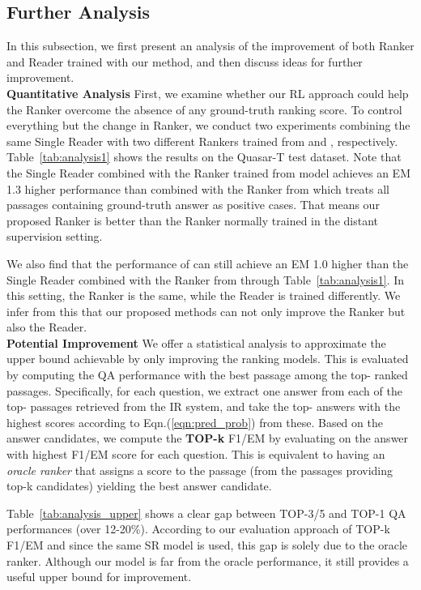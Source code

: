 \documentclass[letterpaper]{article} \usepackage{aaai18}  \usepackage{times}  \usepackage{helvet}  \usepackage{courier}  \usepackage{url}  \usepackage{graphicx}  \usepackage{comment}
\begin{document}
\subsection{Further Analysis}
In this subsection, we first present an analysis of the improvement of both Ranker and Reader trained with our method, and then discuss ideas for further improvement.\\

\noindent\textbf{Quantitative Analysis}\quad
First, we examine whether our RL approach could help the Ranker overcome the absence of any ground-truth ranking score. To control everything but the change in Ranker, we conduct two experiments combining the same Single Reader with two different Rankers trained from  and , respectively. Table~\ref{tab:analysis1} shows the results on the Quasar-T test dataset. Note that the Single Reader combined with the Ranker trained from  model achieves an EM 1.3 higher performance than combined with the Ranker from  which treats all passages containing ground-truth answer as positive cases. That means our proposed Ranker is better than the Ranker normally trained in the distant supervision setting.

We also find that the performance of  can still achieve an EM 1.0 higher than the Single Reader combined with the Ranker from  through Table~\ref{tab:analysis1}. In this setting, the Ranker is the same, while the Reader is trained differently. We infer from this that our proposed methods  can not only improve the Ranker but also the Reader. \\

\noindent\textbf{Potential Improvement}\quad
We offer a statistical analysis to approximate the upper bound achievable by only improving the ranking models.
This is evaluated by computing the QA performance with the best passage among the top- ranked passages.
Specifically, for each question, we extract one answer from each of the top- passages retrieved from the IR system, and take the top- answers with the highest scores according to Eqn.(\ref{eqn:pred_prob}) from these.
Based on the  answer candidates, we compute the \textbf{TOP-k} F1/EM by evaluating on the answer with highest F1/EM score for each question. This is equivalent to having an \emph{oracle ranker} that assigns a  score to the passage (from the passages providing top-k candidates) yielding the best answer candidate.

Table~\ref{tab:analysis_upper} shows a clear gap between TOP-3/5 and TOP-1 QA performances (over 12-20\%). According to our evaluation approach of TOP-k F1/EM and since the same SR model is used, this gap is
solely due to
the oracle ranker. Although our model is far from the oracle performance, it still provides a useful upper bound for improvement. \\
\end{document}
